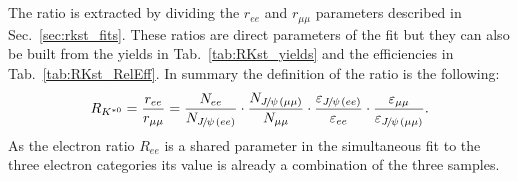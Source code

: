 



%
%
%
%


\subsection{\RKst}

The ratio \RKst is extracted by dividing the $r_{ee}$ and $r_{\mu\mu}$
parameters described in Sec.~\ref{sec:rkst_fits}. These ratios are 
direct parameters of the fit but they can also be built from the yields
in Tab.~\ref{tab:RKst_yields} and the efficiencies in Tab.~\ref{tab:RKst_RelEff}.
In summary the definition of the \RKst ratio is the following:
%
\begin{equation}
\RKst = \frac{r_{ee}}{r_{\mu\mu}}  
= \frac{N_{ee}}{N_{\jpsi(ee)}} 
\cdot \frac{N_{\jpsi(\mu\mu)}}{N_{\mu\mu}}
\cdot \frac{\varepsilon_{\jpsi(ee)}}{\varepsilon_{ee}} 
\cdot \frac{\varepsilon_{\mu\mu}}{\varepsilon_{\jpsi(\mu\mu)}}.
\end{equation}
%
As the electron ratio $R_{ee}$ is a shared parameter in the simultaneous fit to the
three electron categories its value is already a combination of the three samples.

